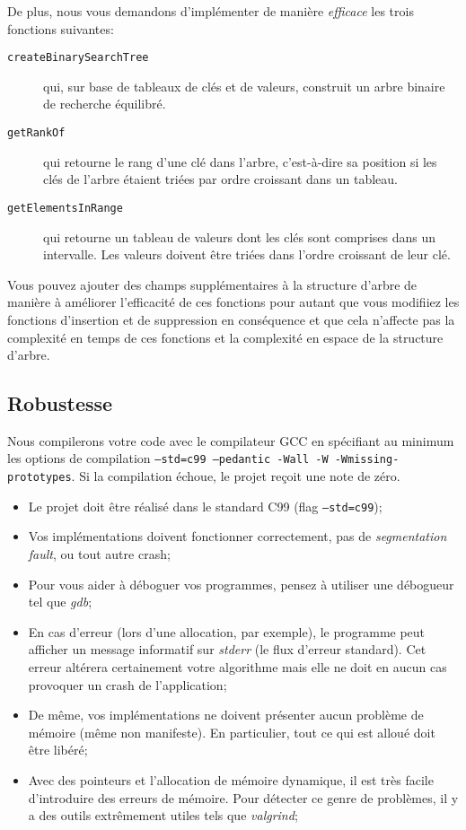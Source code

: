 \documentclass[a4paper,10pt]{article}
\begin{document}
De plus, nous vous demandons d'implémenter de manière {\em efficace} les trois fonctions suivantes:
\begin{description}
\item[\texttt{createBinarySearchTree}] qui, sur base de tableaux
  de clés et de valeurs, construit un arbre binaire de recherche
  équilibré. %
\item[\texttt{getRankOf}] qui retourne le rang d'une clé dans l'arbre,
  c'est-à-dire sa position si les clés de l'arbre étaient triées par
  ordre croissant dans un tableau.
\item[\texttt{getElementsInRange}] qui retourne un tableau de valeurs
  dont les clés sont comprises dans un intervalle. Les valeurs doivent
  être triées dans l'ordre croissant de leur clé.
\end{description}
Vous pouvez ajouter des champs supplémentaires à la structure d'arbre
de manière à améliorer l'efficacité de ces fonctions pour autant que
vous modifiiez les fonctions d'insertion et de suppression en
conséquence et que cela n'affecte pas la complexité en temps de ces
fonctions et la complexité en espace de la structure d'arbre.

\subsection*{Robustesse}

Nous compilerons votre code avec le compilateur GCC en spécifiant au
minimum les options de compilation \texttt{--std=c99 --pedantic -Wall -W -Wmissing-
prototypes}. Si la compilation échoue, le projet reçoit une note de zéro.

\begin{itemize}
\item Le projet doit être réalisé dans le standard C99 (flag
  \texttt{--std=c99});
\item Vos implémentations doivent fonctionner correctement, pas de
  {\em segmentation fault}, ou tout autre crash;
\item Pour vous aider à déboguer vos programmes, pensez à utiliser une
  débogueur tel que {\em gdb};
\item En cas d'erreur (lors d'une allocation, par exemple), le
  programme peut afficher un message informatif sur {\em stderr} (le
  flux d'erreur standard). Cet erreur altérera certainement votre
  algorithme mais elle ne doit en aucun cas provoquer un crash de
  l'application;
\item De même, vos implémentations ne doivent présenter aucun problème
  de mémoire (même non manifeste). En particulier, tout ce qui est
  alloué doit être libéré;
\item Avec des pointeurs et l’allocation de mémoire dynamique, il est
  très facile d’introduire des erreurs de mémoire. Pour détecter ce
  genre de problèmes, il y a des outils extrêmement utiles tels que
  {\em valgrind};
\end{itemize}
\end{document}
